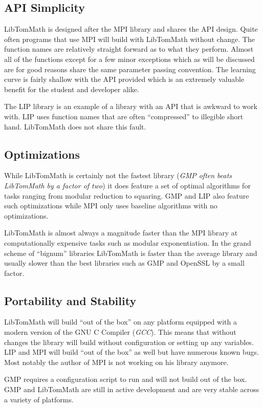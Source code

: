 \documentclass[b5paper]{book}
\begin{document}
\subsection{API Simplicity}
LibTomMath is designed after the MPI library and shares the API design.  Quite often programs that use MPI will build 
with LibTomMath without change. The function names are relatively straight forward as to what they perform.  Almost all of the 
functions except for a few minor exceptions which as will be discussed are for good reasons share the same parameter passing 
convention.  The learning curve is fairly shallow with the API provided which is an extremely valuable benefit for the 
student and developer alike.  

The LIP library is an example of a library with an API that is awkward to work with.  LIP uses function names that are often ``compressed'' to 
illegible short hand.  LibTomMath does not share this fault.

\subsection{Optimizations}
While LibTomMath is certainly not the fastest library (\textit{GMP often beats LibTomMath by a factor of two}) it does
feature a set of optimal algorithms for tasks ranging from modular reduction to squaring.  GMP and LIP also feature
such optimizations while MPI only uses baseline algorithms with no optimizations.

LibTomMath is almost always a magnitude faster than the MPI library at computationally expensive tasks such as modular
exponentiation.  In the grand scheme of ``bignum'' libraries LibTomMath is faster than the average library and usually  
slower than the best libraries such as GMP and OpenSSL by a small factor.

\subsection{Portability and Stability}
LibTomMath will build ``out of the box'' on any platform equipped with a modern version of the GNU C Compiler 
(\textit{GCC}).  This means that without changes the library will build without configuration or setting up any 
variables.  LIP and MPI will build ``out of the box'' as well but have numerous known bugs.  Most notably the author of 
MPI is not working on his library anymore.  

GMP requires a configuration script to run and will not build out of the box.   GMP and LibTomMath are still in active
development and are very stable across a variety of platforms.
\end{document}
